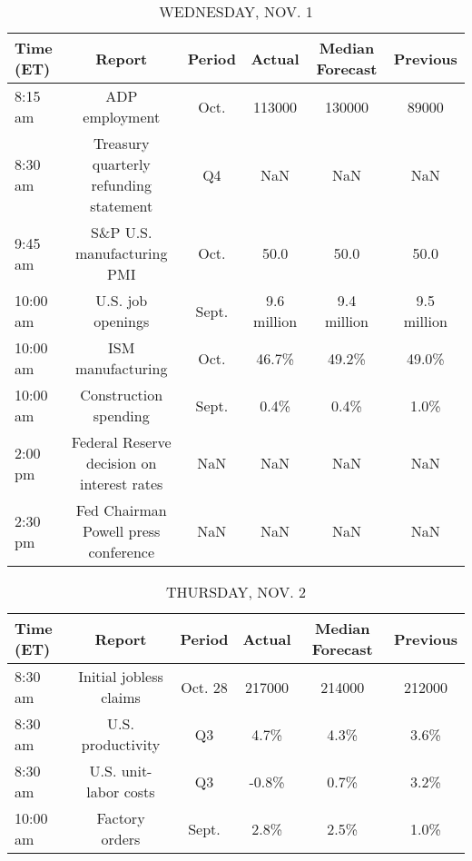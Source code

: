 \documentclass{article}%
\begin{document}
\begin{table}[htbp]%
\caption{WEDNESDAY, NOV. 1}%
\centering%
\begin{adjustbox}{width=1\textwidth}%
\begin{tabular}{lccccc}
\toprule
Time (ET) &                                     Report & Period &      Actual & Median Forecast &    Previous \\
\midrule
  8:15 am &                             ADP employment &   Oct. &      113000 &          130000 &       89000 \\
  8:30 am &     Treasury quarterly refunding statement &     Q4 &         NaN &             NaN &         NaN \\
  9:45 am &                 S\&P U.S. manufacturing PMI &   Oct. &        50.0 &            50.0 &        50.0 \\
 10:00 am &                          U.S. job openings &  Sept. & 9.6 million &     9.4 million & 9.5 million \\
 10:00 am &                          ISM manufacturing &   Oct. &       46.7\% &           49.2\% &       49.0\% \\
 10:00 am &                      Construction spending &  Sept. &        0.4\% &            0.4\% &        1.0\% \\
  2:00 pm & Federal Reserve decision on interest rates &    NaN &         NaN &             NaN &         NaN \\
  2:30 pm &       Fed Chairman Powell press conference &    NaN &         NaN &             NaN &         NaN \\
\bottomrule
\end{tabular}
%
\end{adjustbox}%
\end{table}

%


\begin{table}[htbp]%
\caption{THURSDAY, NOV. 2}%
\centering%
\begin{adjustbox}{width=1\textwidth}%
\begin{tabular}{lccccc}
\toprule
Time (ET) &                 Report &  Period & Actual & Median Forecast & Previous \\
\midrule
  8:30 am & Initial jobless claims & Oct. 28 & 217000 &          214000 &   212000 \\
  8:30 am &      U.S. productivity &      Q3 &   4.7\% &            4.3\% &     3.6\% \\
  8:30 am &  U.S. unit-labor costs &      Q3 &  -0.8\% &            0.7\% &     3.2\% \\
 10:00 am &         Factory orders &   Sept. &   2.8\% &            2.5\% &     1.0\% \\
\bottomrule
\end{tabular}
%
\end{adjustbox}%
\end{table}
\end{document}
